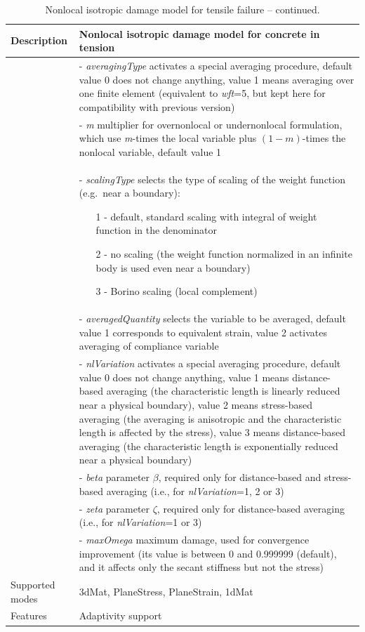 \documentclass[a4paper]{article}
\newcommand{\param}[1]{{\it #1}}
\newenvironment{mmt}{\begin{tabular}{|l|p{9cm}|}}{\end{tabular}\\}
\newenvironment{mmt}{\begin{tabular}{|l|l|}}{\end{tabular}\\}
\begin{document}
\begin{table}[!htb]
\begin{mmt}
\hline
Description & Nonlocal isotropic damage model for concrete in tension\\
\hline
&- \param{averagingType} activates a special averaging procedure, default value 0 does not change anything, value 1 means averaging over one finite element 
(equivalent to {\it wft}=5, but kept here for compatibility with previous version)\\
&- \param{m} multiplier for overnonlocal or undernonlocal formulation, which use
{\em m}-times the local variable plus $(1-m)$-times the nonlocal variable, default value 1\\
&- \param{scalingType} selects the type of scaling of the weight function (e.g.\ near a boundary):
\begin{itemize}\setlength{\itemsep}{-5pt}
\item[1 -] default, standard scaling with integral of weight function in the denominator
\item[2 -] no scaling (the weight function normalized in an infinite body is used even near a boundary)
\item[3 -] Borino scaling (local complement)
\end{itemize}\\
&- \param{averagedQuantity} selects the variable to be averaged, default value 1 corresponds to equivalent strain, value 2 activates averaging of compliance variable\\
&- \param{nlVariation} activates a special averaging procedure, default value 0 does not change anything, value 1 means distance-based averaging (the characteristic length is linearly reduced near a physical boundary), value 2 means stress-based averaging  (the averaging is anisotropic and the characteristic length is affected by the stress), value 3 means distance-based averaging (the characteristic length is exponentially reduced near a physical boundary) \\
&- \param{beta} parameter $\beta$, required only for distance-based and stress-based averaging (i.e., for {\it nlVariation}=1, 2 or 3) \\
&- \param{zeta} parameter $\zeta$, required only for distance-based averaging (i.e., for {\it nlVariation}=1 or 3) \\
&- \param{maxOmega} maximum damage, used for convergence improvement
(its value is between 0 and 0.999999 (default), and it affects only the secant stiffness
but not the stress)\\
Supported modes& 3dMat, PlaneStress, PlaneStrain, 1dMat\\
Features & Adaptivity support\\
\hline
\end{mmt}
\caption{Nonlocal isotropic damage model for tensile failure -- continued.}
\label{idnl_table_cont}
\end{table}
\end{document}
